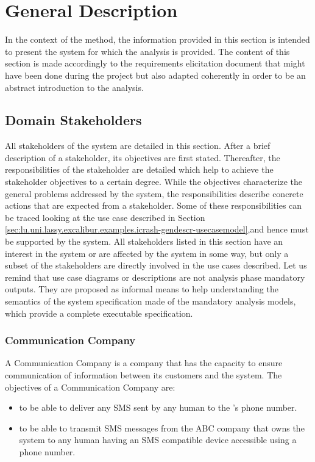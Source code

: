 
\chapter{General Description}
\label{chap:general_description}

In the context of the \msrmessir method, the information provided in this section is intended to present the system for which the \msrmessir analysis is provided. The content of this section is made accordingly to the requirements elicitation document that might have been done during the project but also adapted coherently in order to be an abstract introduction to the \msrmessir analysis.

\section{Domain Stakeholders}
\label{sec:lu.uni.lassy.excalibur.examples.icrash-gendescr-stakeholders}

All stakeholders of the system are detailed in this section. After a brief description of a
stakeholder, its objectives are first stated. Thereafter, the responsibilities of
the stakeholder are detailed which help to achieve the stakeholder objectives to a certain
degree. While the objectives characterize the general problems addressed by the \msricrash system,
the responsibilities describe concrete actions that are expected from a stakeholder. Some of
these responsibilities can be traced looking at the use case described in Section \ref{sec:lu.uni.lassy.excalibur.examples.icrash-gendescr-usecasemodel},and hence must be supported by the \msricrash  system. 
All stakeholders listed in this section have an interest in the system or are affected
by the system in some way, but only a subset of the stakeholders are directly involved in the use
cases described.
Let us remind that use case diagrams or descriptions are not \msrmessir analysis phase mandatory outputs. They are proposed as informal means to help understanding the semantics of the system specification made of the mandatory analysis models, which provide a complete executable specification.

\subsection{Communication Company}
A Communication Company is a company that has the capacity to ensure communication of information between its customers and the \msricrash system. 
The objectives of a Communication Company are:
\begin{itemize}
  \item to be able to deliver any SMS sent by any human to the \msricrash's phone number.
  \item to be able to transmit SMS messages from the ABC company that owns the \msricrash system to any human having an SMS compatible device accessible using a phone number.
\end{itemize}
\vspace{0.5cm}

